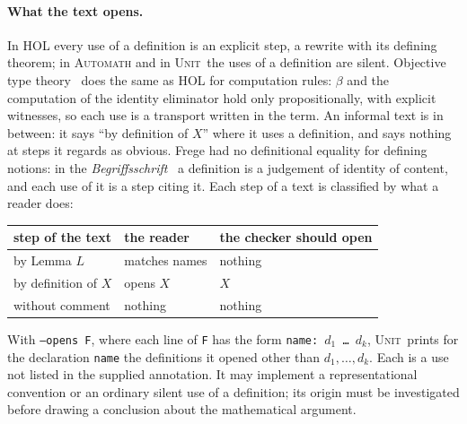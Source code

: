 \documentclass[11pt]{article}
\newcommand{\sys}{\textsc{Unit}}
\newcommand{\kw}[1]{\texttt{#1}}
\begin{document}
\paragraph{What the text opens.} In HOL every use of a definition is an
explicit step, a rewrite with its defining theorem; in \textsc{Automath}
and in \sys\ the uses of a definition are silent. Objective type
theory~\cite{OTT} does the same as HOL for computation rules: $\beta$ and
the computation of the identity eliminator hold only propositionally,
with explicit witnesses, so each use is a transport written in the
term. An informal text is in
between: it says ``by definition of $X$'' where it uses a definition,
and says nothing at steps it regards as obvious. Frege had no
definitional equality for defining notions: in the
\emph{Begriffsschrift}~\cite{Frege} a definition is a judgement of
identity of content, and each use of it is a step citing it.
Each step of a text is classified by what a reader does:
\begin{center}
\begin{tabular}{lll}
\toprule
step of the text & the reader & the checker should open\\
\midrule
by Lemma $L$ & matches names & nothing\\
by definition of $X$ & opens $X$ & $X$\\
without comment & nothing & nothing\\
\bottomrule
\end{tabular}
\end{center}
With \kw{--opens F}, where each line of \kw{F} has the form
\kw{name: $d_1$ \dots\ $d_k$}, \sys\ prints for the declaration
\kw{name} the definitions it opened other than $d_1,\dots,d_k$. Each is
a use not listed in the supplied annotation. It may implement a
representational convention or an ordinary silent use of a definition;
its origin must be investigated before drawing a conclusion about the
mathematical argument.
\end{document}
